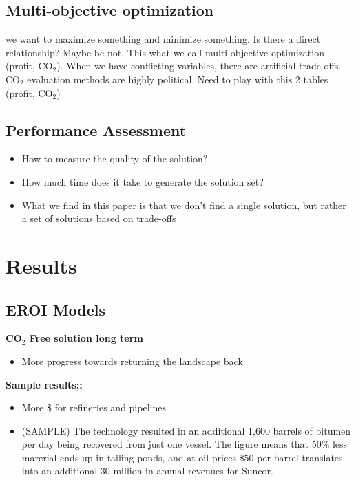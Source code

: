 \documentclass[12pt]{article}
\begin{document}
\subsection{Multi-objective optimization}
we want to maximize something and minimize something. Is there a direct relationship?
Maybe be not. This what we call multi-objective optimization (profit, CO$_2$). When we have conflicting variables, there are artificial trade-offs.  \\

CO$_2$ evaluation methods are highly political. Need to play with this 2 tables (profit, CO$_2$)

\subsection{Performance Assessment}
\begin{itemize}
\item How to measure the quality of the solution? 
\item How much time does it take to generate the solution set?
\item What we find in this paper is that we don't find a single solution, but rather a set of solutions based on trade-offs
\end{itemize}


\section{Results}
\subsection{EROI Models}

{\bf CO$_2$ Free solution long term}
\begin{itemize}
\item More progress towards returning the landscape back
\end{itemize}


{\bf Sample results;;}
\begin{itemize}
\item More \$ for refineries and pipelines
\item (SAMPLE) The technology resulted in an additional 1,600 barrels of bitumen per day being recovered from just one vessel. The figure means that 50\% less marerial ends up in tailing ponds, and at oil prices \$50 per barrel translates into an additional 30 million in annual revenues for Suncor. 
\end{itemize}
\end{document}
